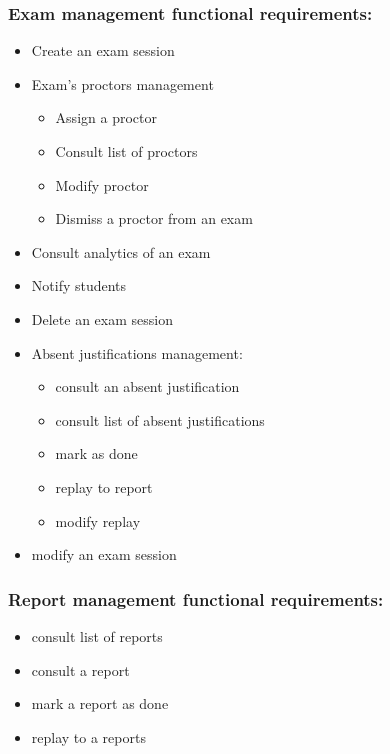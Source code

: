 \documentclass[a4paper,12p]{article}
\begin{document}
     \subsubsection{Exam management functional requirements:}
     \begin{itemize}
         \item Create an exam session
         \item Exam's proctors management
         \begin{itemize}
             \item Assign a proctor
             \item Consult list of proctors
             \item Modify proctor
             \item Dismiss a proctor from an exam
         \end{itemize}
         \item Consult analytics of an exam
         \item Notify students
         \item Delete an exam session
         \item Absent justifications management:
         \begin{itemize}
             \item consult an absent justification
             \item consult list of absent justifications
             \item mark as done
             \item replay to report
             \item modify replay
         \end{itemize}
         \item modify an exam session
     \end{itemize}

     \subsubsection{Report management functional requirements:}
     \begin{itemize}
         \item consult list of reports
         \item consult a report
         \item mark a report as done
         \item replay to a reports
     \end{itemize}
\end{document}
